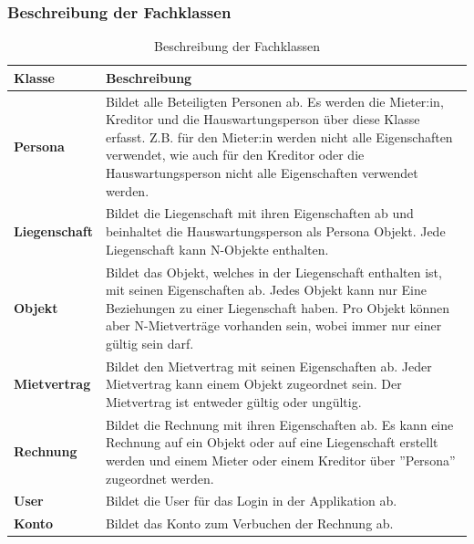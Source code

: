 \subsubsection{Beschreibung der Fachklassen}
\begin{table}[H]
  \centering
  \settowidth{}
  \setlength\extrarowheight{2pt}
    \begin{tabulary}{1.0\textwidth}{|L|m{15cm}|}
      \hline
      \textbf{Klasse}& \textbf{Beschreibung}\\
    \hline
    \textbf{Persona} & Bildet alle Beteiligten Personen ab. Es werden die Mieter:in, Kreditor und die Hauswartungsperson über diese Klasse erfasst. Z.B. für den Mieter:in werden nicht alle Eigenschaften verwendet, wie auch für den Kreditor oder die Hauswartungsperson nicht alle Eigenschaften verwendet werden.\\
    \hline
    \textbf{Liegenschaft} & Bildet die Liegenschaft mit ihren Eigenschaften ab und beinhaltet die Hauswartungsperson als Persona Objekt. Jede Liegenschaft kann N-Objekte enthalten.\\
    \hline
    \textbf{Objekt} & Bildet das Objekt, welches in der Liegenschaft enthalten ist, mit seinen Eigenschaften ab. Jedes Objekt kann nur Eine Beziehungen zu einer Liegenschaft haben. Pro Objekt können aber N-Mietverträge vorhanden sein, wobei immer nur einer gültig sein darf. \\
    \hline
    \textbf{Mietvertrag} & Bildet den Mietvertrag mit seinen Eigenschaften ab. Jeder Mietvertrag kann einem Objekt zugeordnet sein. Der Mietvertrag ist entweder gültig oder ungültig.\\
    \hline
    \textbf{Rechnung} & Bildet die Rechnung mit ihren Eigenschaften ab. Es kann eine Rechnung auf ein Objekt oder auf eine Liegenschaft erstellt werden und einem Mieter oder einem Kreditor über ''Persona'' zugeordnet werden.\\
    \hline
    \textbf{User} & Bildet die User für das Login in der Applikation ab.\\
    \hline
    \textbf{Konto} & Bildet das Konto zum Verbuchen der Rechnung ab.\\
    \hline 
\end{tabulary}
\caption{Beschreibung der Fachklassen}
\end{table}

